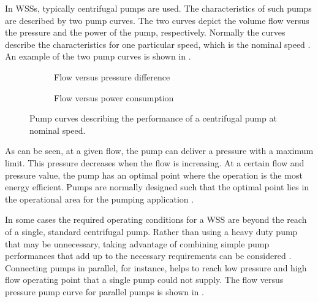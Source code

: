 In WSSs, typically centrifugal pumps are used. The characteristics of such pumps are described by two pump curves. The two curves depict the volume flow versus the pressure and the power of the pump, respectively. Normally the curves describe the characteristics for one particular speed, which is the nominal speed \cite{kallesoePHD}. An example of the two pump curves is shown in .

\begin{figure}[H]
\centering
\begin{subfigure}{.49\textwidth}
\centering
   
  \caption{Flow versus pressure difference}
  \label{fig:sub1}
\end{subfigure}
\begin{subfigure}{.49\textwidth}
\centering
\vspace{-0.4mm}
 
\vspace{0mm}
  \caption{Flow versus power consumption}
  \label{fig:sub2}
\end{subfigure}
\caption{Pump curves describing the performance of a centrifugal pump at nominal speed.}
\label{fig:pump_curves}
\end{figure}

%  

\vspace{-3mm}

As can be seen, at a given flow, the pump can deliver a pressure with a maximum limit. This pressure decreases when the flow is increasing. At a certain flow and pressure value, the pump has an optimal point where the operation is the most energy efficient. Pumps are normally designed such that the optimal point lies in the operational area for the pumping application \cite{kenneth_houe}. 

In some cases the required operating conditions for a WSS are beyond the reach of a single, standard centrifugal pump. Rather than using a heavy duty pump that may be unnecessary, taking advantage of combining simple pump performances that add up to the necessary requirements can be considered \cite{kenneth_houe}. Connecting pumps in parallel, for instance, helps to reach low pressure and high flow operating point that a single pump could not supply. The flow versus pressure pump curve for parallel pumps is shown in .

